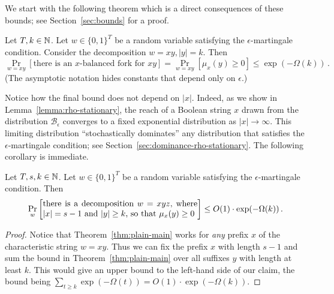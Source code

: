 We start with the following theorem 
which is a direct consequences of these bounds; see Section~\ref{sec:bounds} for a proof.
\begin{theorem}\label{thm:plain-main}
  Let $T, k \in \mathbb{N}$.
  Let $w \in \{0,1\}^T$ be a random variable
  satisfying the $\epsilon$-martingale condition. 
  Consider the decomposition $w = xy, |y| = k$.  
  Then
  \[
    \Pr_{w = xy}[\text{there is an $x$-balanced fork for $xy$}] 
    = \Pr_{w = xy}[\mu_x(y) \geq 0] 
    \leq \exp(-\Omega(k))
    \,.
  \]
  (The asymptotic notation hides constants that depend only on $\epsilon$.)
\end{theorem}
Notice how the final bound does not depend on $|x|$. 
Indeed, as we show in Lemma~\ref{lemma:rho-stationary}, 
the reach of a Boolean string $x$ 
drawn from the distribution $\mathcal{B}_\epsilon$ 
converges to a fixed exponential distribution as
$|x| \rightarrow \infty$. 
This limiting distribution ``stochastically dominates'' 
any distribution that satisfies the $\epsilon$-martingale condition; 
see Section~\ref{sec:dominance-rho-stationary}.
The following corollary is immediate.
\begin{corollary}\label{cor:main} 
  Let $T, s, k \in \mathbb{N}$.
  Let $w \in \{0,1\}^T$ be a 
  random variable satisfying the $\epsilon$-martingale condition. 
  Then
  \begin{align}\label{eq:cor-main}
    \Pr_w\left[\parbox{65mm}{
      there is a decomposition $w = xyz$, 
      where $|x| = s - 1$ and $|y| \geq k$, 
      so that $\mu_x(y) \geq 0$ 
    }\right] 
      \leq O(1) \cdot \exp(-\Omega(k))
    \,.
  \end{align}
\end{corollary}
\begin{proof}
  Notice that Theorem~\ref{thm:plain-main} works for \emph{any} prefix $x$ 
  of the characteristic string $w = xy$.
  Thus we can fix the prefix $x$ with length $s - 1$ and 
  sum the bound in Theorem~\ref{thm:plain-main} 
  over all suffixes $y$ with length at least $k$. 
  This would give an upper bound to the left-hand side of our claim, 
  the bound being 
  $\sum_{t \geq k} \exp(-\Omega(t)) = O(1)\cdot \exp(-\Omega(k))$. 
\end{proof}

